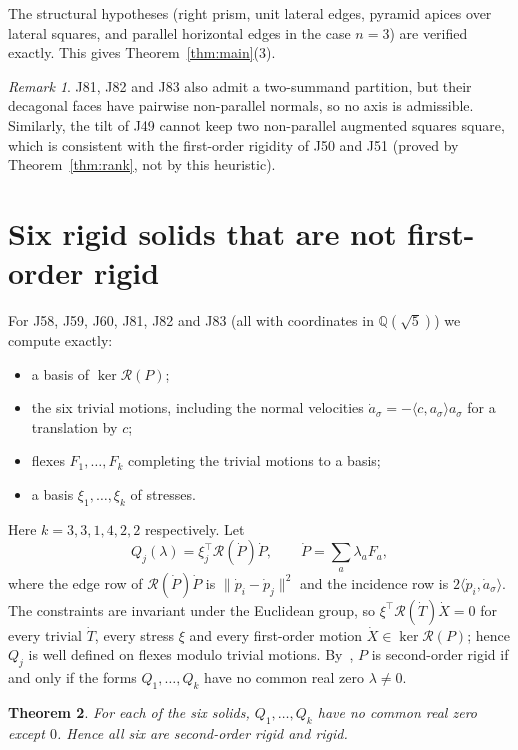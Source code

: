 \documentclass[11pt]{amsart}
\newtheorem{theorem}{Theorem}[section]
\theoremstyle{remark}
\newtheorem{remark}[theorem]{Remark}
\newcommand{\Q}{\mathbb Q}
\newcommand{\RR}{\mathcal R}
\begin{document}
The structural hypotheses (right prism, unit lateral edges, pyramid apices over lateral squares, and parallel horizontal edges in the case $n=3$) are verified exactly. This gives Theorem~\ref{thm:main}(3).

\begin{remark}
J81, J82 and J83 also admit a two-summand partition, but their decagonal faces have pairwise non-parallel normals, so no axis is admissible. Similarly, the tilt of J49 cannot keep two non-parallel augmented squares square, which is consistent with the first-order rigidity of J50 and J51 (proved by Theorem~\ref{thm:rank}, not by this heuristic).
\end{remark}

\section{Six rigid solids that are not first-order rigid}\label{sec:second}

For J58, J59, J60, J81, J82 and J83 (all with coordinates in $\Q(\sqrt5)$) we compute exactly:
\begin{itemize}
\item a basis of $\ker\RR(P)$;
\item the six trivial motions, including the normal velocities $\dot a_\sigma=-\langle c,a_\sigma\rangle a_\sigma$ for a translation by $c$;
\item flexes $F_1,\dots,F_k$ completing the trivial motions to a basis;
\item a basis $\xi_1,\dots,\xi_k$ of stresses.
\end{itemize}
Here $k=3,3,1,4,2,2$ respectively. Let
\[
Q_j(\lambda)=\xi_j^\top\RR(\dot P)\dot P,\qquad \dot P=\textstyle\sum_a\lambda_aF_a,
\]
where the edge row of $\RR(\dot P)\dot P$ is $\|\dot p_i-\dot p_j\|^2$ and the incidence row is $2\langle\dot p_i,\dot a_\sigma\rangle$. The constraints are invariant under the Euclidean group, so $\xi^\top\RR(\dot T)\dot X=0$ for every trivial $\dot T$, every stress $\xi$ and every first-order motion $\dot X\in\ker\RR(P)$; hence $Q_j$ is well defined on flexes modulo trivial motions. By~\cite[Thm.~4.2]{AHWZ2026}, $P$ is second-order rigid if and only if the forms $Q_1,\dots,Q_k$ have no common real zero $\lambda\neq0$.

\begin{theorem}\label{thm:second}
For each of the six solids, $Q_1,\dots,Q_k$ have no common real zero except $0$. Hence all six are second-order rigid and rigid.
\end{theorem}
\end{document}
